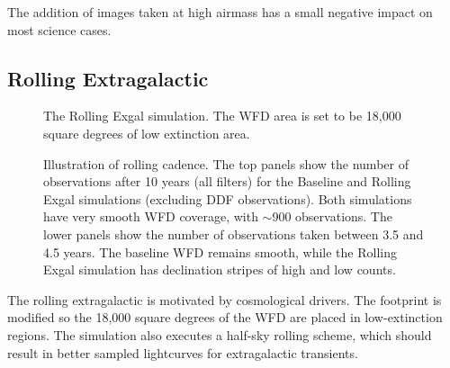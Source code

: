 The addition of images taken at high airmass has a small negative impact on most science cases. 

\subsection{Rolling Extragalactic}\label{ss:1.6extragalactic}

\begin{figure}
\caption{The Rolling Exgal simulation. The WFD area is set to be 18,000 square degrees of low extinction area.}\label{fig:rollingexgal}
\end{figure}


\begin{figure}
\caption{Illustration of rolling cadence. The top panels show the number of observations after 10 years (all filters) for the Baseline and Rolling Exgal simulations (excluding DDF observations). Both simulations have very smooth WFD coverage, with $\sim$900 observations.  The lower panels show the number of observations taken between 3.5 and 4.5 years.  The baseline WFD remains smooth, while the Rolling Exgal simulation has declination stripes of high and low counts.}\label{fig:exgalroll}
\end{figure}


The rolling extragalactic is motivated by cosmological drivers. The footprint is modified so the 18,000 square degrees of the WFD are placed in low-extinction regions. The simulation also executes a half-sky rolling scheme, which should result in better sampled lightcurves for extragalactic transients.


